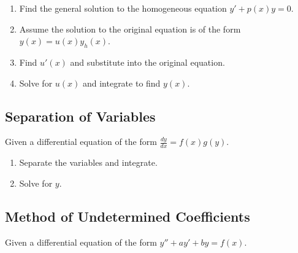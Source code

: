 \documentclass[12pt]{article}
\begin{document}
\begin{enumerate}
  \item Find the general solution to the homogeneous equation $y' + p(x)y = 0$.
  \item Assume the solution to the original equation is of the form $y(x) = u(x) y_h(x)$.
  \item Find $u'(x)$ and substitute into the original equation.
  \item Solve for $u(x)$ and integrate to find $y(x)$.
\end{enumerate}

\subsection*{Separation of Variables}

Given a differential equation of the form $\frac{dy}{dx} = f(x)g(y)$.

\begin{enumerate}
  \item Separate the variables and integrate.
  \item Solve for $y$.
\end{enumerate}

\subsection*{Method of Undetermined Coefficients}

Given a differential equation of the form $y'' + ay' + by = f(x)$.
\end{document}
